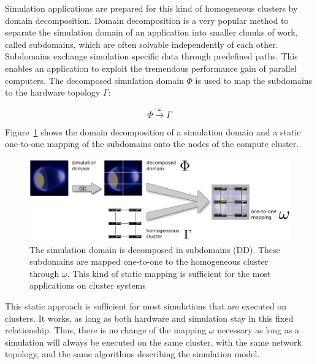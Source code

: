 Simulation applications are prepared for this kind of homogeneous
clusters by domain decomposition. Domain decomposition is a very
popular method to separate the simulation domain of an application
into smaller chunks of work, called subdomains, which are often
solvable independently of each other. Subdomains exchange simulation
specific data through predefined paths. This enables an application to
exploit the tremendous performance gain of parallel computers.  The
decomposed simulation domain $\Phi$ is used to map the subdomains to
the hardware topology $\Gamma$:

\[\Phi \xrightarrow{\omega} \Gamma\]

\noindent 
Figure~\ref{fig:domain_decomposition} shows the domain decomposition
of a simulation domain and a static one-to-one mapping of the
subdomains onto the nodes of the compute cluster.


\begin{figure}[H]
  \centering \includegraphics[width=\textwidth]{graphics/30_domain_decomposition}
  \caption{The simulation domain is decomposed in subdomains
    (DD). These subdomains are mapped one-to-one to the homogeneous
    cluster through $\omega$.  This kind of static mapping is
    sufficient for the most applications on cluster systems}
  \label{fig:domain_decomposition}
\end{figure}

\noindent This static approach is sufficient for most simulations that
are executed on clusters. It works, as long as both hardware and
simulation stay in this fixed relationship. Thus, there is no change
of the mapping $\omega$ necessary as long as a simulation will always
be executed on the same cluster, with the same network topology, and
the same algorithms describing the simulation model.

